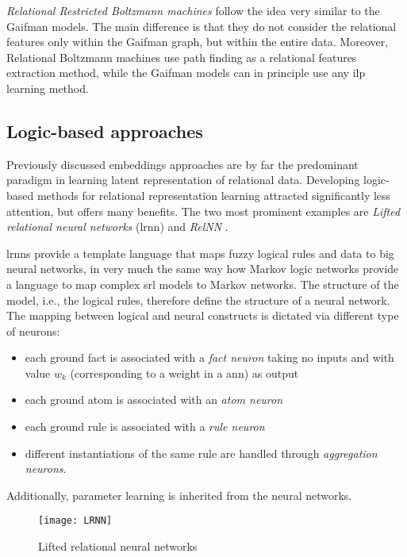 \textit{Relational Restricted Boltzmann machines} follow the idea very similar to the Gaifman models.
The main difference is that they do not consider the relational features only within the Gaifman graph, but within the entire data.
Moreover, Relational Boltzmann machines use path finding as a relational features extraction method, while the Gaifman models can in principle use any \gls{ilp} learning method.






\subsection{Logic-based approaches}



Previously discussed embeddings approaches are by far the predominant paradigm in learning latent representation of relational data.
Developing logic-based methods for relational representation learning attracted significantly less attention, but offers many benefits.
The two most prominent examples are \textit{Lifted relational neural networks} (\gls{lrnn}) \cite{LRNN} and \textit{RelNN} \cite{Kazemi2018}.



\gls{lrnn}s provide a template language that maps  fuzzy logical rules and data to big neural networks, in very much the same way how Markov logic networks provide a language to map complex \gls{srl} models to Markov networks.
The structure of the model, i.e.,  the logical rules, therefore define the structure of a neural network.
The mapping between logical and neural constructs is dictated via different type of neurons:
\begin{itemize}
	\item each ground fact is associated with a \textit{fact neuron} taking no inputs and with value $w_k$ (corresponding to a weight in a \gls{ann}) as output
	\item each ground atom is associated with an \textit{atom neuron}
	\item each ground rule is associated with a \textit{rule neuron}
	\item different instantiations of the same rule are handled through \textit{aggregation neurons}.
\end{itemize}
Additionally, parameter learning is inherited from the neural networks.


\begin{figure}
	\medskip
	\centering
	\texttt{[image: LRNN]}
	\label{fig:lrnn}
	\caption{Lifted relational neural networks}
\end{figure}


